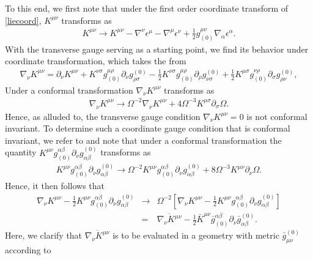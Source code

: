 To this end, we first note that under the first order coordinate transform of \eqref{liecoord}, $K^{\mu\nu}$ transforms as
%
\begin{eqnarray}
K^{\mu\nu}\rightarrow K^{\mu\nu}-\nabla^{\nu}\epsilon^{\mu}-\nabla^{\mu}\epsilon^{\nu}+\frac{1}{2}g_{(0)}^{\mu\nu}\nabla_{\alpha}\epsilon^{\alpha}.
\label{AP17}
\end{eqnarray}
% 
With the transverse gauge serving as a starting point, we find its behavior under coordinate transformation, which takes the from
%
\begin{eqnarray}
\nabla_{\nu}K^{\mu\nu}=
\partial_{\nu}K^{\mu\nu}
+K^{\nu\sigma}g_{(0)}^{\mu\rho}\partial_{\nu}g^{(0)}_{\rho\sigma}
-\frac{1}{2}K^{\nu\sigma}g_{(0)}^{\mu\rho}\partial_{\rho}g^{(0)}_{\nu\sigma}
+\frac{1}{2}K^{\mu\sigma}g_{(0)}^{\nu\rho}\partial_{\sigma}g^{(0)}_{\rho\nu},
\label{AP18}
\end{eqnarray}
% 
Under a conformal transformation $\nabla_{\nu}K^{\mu\nu}$ transforms as
%
\begin{eqnarray}
\nabla_{\nu}K^{\mu\nu}\rightarrow \Omega^{-2}\nabla_{\nu}K^{\mu\nu}+4\Omega^{-3}K^{\mu\sigma}\partial_{\sigma}\Omega.
\label{AP19}
\end{eqnarray}
% 
Hence, as alluded to, the transverse gauge condition $\nabla_{\nu}K^{\mu\nu}=0$ is not conformal invariant. To determine such a coordinate gauge condition that is conformal invariant, we refer to \cite{amarasinghe_2019} and note that under a conformal transformation the quantity $K^{\mu\nu}g_{(0)}^{\alpha\beta}\partial_{\nu}g^{(0)}_{\alpha\beta}$ transforms as
%
\begin{eqnarray}
K^{\mu\nu}g_{(0)}^{\alpha\beta}\partial_{\nu}g^{(0)}_{\alpha\beta}
\rightarrow \Omega^{-2}K^{\mu\nu}g_{(0)}^{\alpha\beta}\partial_{\nu}g^{(0)}_{\alpha\beta}
+8\Omega^{-3}K^{\mu\nu}\partial_{\nu}\Omega.
\label{AP20}
\end{eqnarray}
%
Hence, it then follows that 
%
\begin{eqnarray}
\nabla_{\nu}K^{\mu\nu}-\frac{1}{2} K^{\mu\nu}g_{(0)}^{\alpha\beta}\partial_{\nu}g^{(0)}_{\alpha\beta}&\rightarrow &\Omega^{-2}\left[\nabla_{\nu}K^{\mu\nu}
-\frac{1}{2} K^{\mu\nu}g_{(0)}^{\alpha\beta}\partial_{\nu}g^{(0)}_{\alpha\beta}\right]
\nonumber\\
&=&\overline{\nabla_{\nu}K^{\mu\nu}}-\frac{1}{2} \bar{K}^{\mu\nu}\bar{g}_{(0)}^{\alpha\beta}\partial_{\nu}\bar{g}^{(0)}_{\alpha\beta}.
\label{AP21}
\end{eqnarray}
% 
Here, we clarify that $\overline{\nabla_{\nu}K^{\mu\nu}}$ is to be evaluated in a geometry with metric $\bar{g}^{(0)}_{\mu\nu}$ according to 
